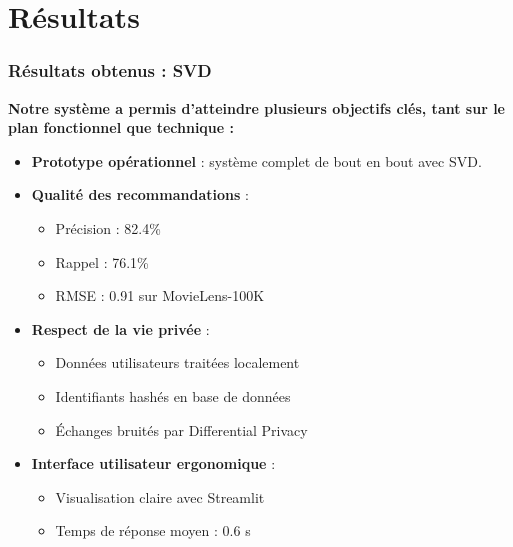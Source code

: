 \documentclass{beamer}
\begin{document}
\section{Résultats}
\begin{frame}
    \frametitle{Résultats obtenus : SVD}
    \scriptsize
    \textbf{Notre système a permis d’atteindre plusieurs objectifs clés, tant sur le plan fonctionnel que technique :}

    \vspace{0.3cm}
    \begin{itemize}
        \item \textbf{Prototype opérationnel} : système complet de bout en bout avec SVD.
        \item \textbf{Qualité des recommandations} :
        \begin{itemize}
            \item Précision : 82.4\%
            \item Rappel : 76.1\%
            \item RMSE : 0.91 sur MovieLens-100K
        \end{itemize}
        \item \textbf{Respect de la vie privée} :
        \begin{itemize}
            \item Données utilisateurs traitées localement
            \item Identifiants hashés en base de données
            \item Échanges bruités par Differential Privacy
        \end{itemize}
        \item \textbf{Interface utilisateur ergonomique} :
        \begin{itemize}
            \item Visualisation claire avec Streamlit
            \item Temps de réponse moyen : 0.6 s
        \end{itemize}
    \end{itemize}
\end{frame}
\end{document}
